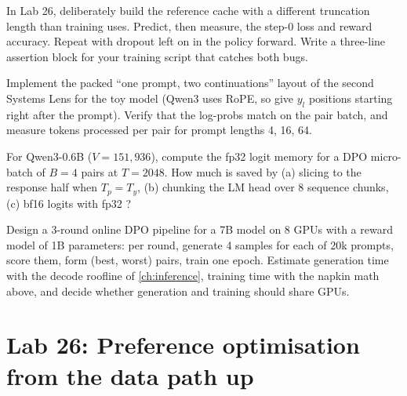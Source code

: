 \begin{exercise}
In Lab 26, deliberately build the reference cache with a different truncation length than training
uses. Predict, then measure, the step-0 loss and reward accuracy. Repeat with dropout left on in
the policy forward. Write a three-line assertion block for your training script that catches
both bugs.
\end{exercise}

\begin{exercise}
Implement the packed ``one prompt, two continuations'' layout of the second Systems Lens for the toy
model (Qwen3 uses RoPE, so give $y_l$ positions starting right after the prompt). Verify that the
log-probs match  on the pair batch, and measure tokens processed per pair
for prompt lengths 4, 16, 64.
\end{exercise}

\begin{exercise}
For Qwen3-0.6B ($V=151{,}936$), compute the fp32 logit memory for a DPO micro-batch of $B=4$ pairs
at $T=2048$. How much is saved by (a) slicing to the response half when $T_p=T_y$, (b) chunking the
LM head over 8 sequence chunks, (c) bf16 logits with fp32 ?
\end{exercise}

\begin{exercise}
Design a 3-round online DPO pipeline for a 7B model on 8 GPUs with a reward model of 1B parameters:
per round, generate 4 samples for each of 20k prompts, score them, form (best, worst) pairs, train one epoch.
Estimate generation time with the decode roofline of \cref{ch:inference}, training time with
the napkin math above, and decide whether generation and training should share GPUs.
\end{exercise}

\section{Lab 26: Preference optimisation from the data path up}\label{sec:dpo:lab}

